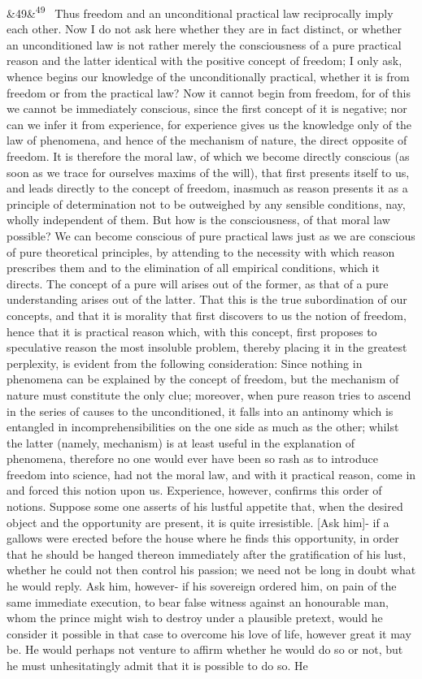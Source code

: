 \documentclass[12pt]{article}
\newcommand{\para}[1][]{\par\noindent\ifx&#1&\else\textsuperscript{\footnotesize #1}~\fi}
\begin{document}
\para[49] Thus freedom and an unconditional practical law reciprocally imply each other. Now I do not ask here whether they are in fact distinct, or whether an unconditioned law is not rather merely the consciousness of a pure practical reason and the latter identical with the positive concept of freedom; I only ask, whence begins our knowledge of the unconditionally practical, whether it is from freedom or from the practical law? Now it cannot begin from freedom, for of this we cannot be immediately conscious, since the first concept of it is negative; nor can we infer it from experience, for experience gives us the knowledge only of the law of phenomena, and hence of the mechanism of nature, the direct opposite of freedom. It is therefore the moral law, of which we become directly conscious (as soon as we trace for ourselves maxims of the will), that first presents itself to us, and leads directly to the concept of freedom, inasmuch as reason presents it as a principle of determination not to be outweighed by any sensible conditions, nay, wholly independent of them. But how is the consciousness, of that moral law possible? We can become conscious of pure practical laws just as we are conscious of pure theoretical principles, by attending to the necessity with which reason prescribes them and to the elimination of all empirical conditions, which it directs. The concept of a pure will arises out of the former, as that of a pure understanding arises out of the latter. That this is the true subordination of our concepts, and that it is morality that first discovers to us the notion of freedom, hence that it is practical reason which, with this concept, first proposes to speculative reason the most insoluble problem, thereby placing it in the greatest perplexity, is evident from the following consideration: Since nothing in phenomena can be explained by the concept of freedom, but the mechanism of nature must constitute the only clue; moreover, when pure reason tries to ascend in the series of causes to the unconditioned, it falls into an antinomy which is entangled in incomprehensibilities on the one side as much as the other; whilst the latter (namely, mechanism) is at least useful in the explanation of phenomena, therefore no one would ever have been so rash as to introduce freedom into science, had not the moral law, and with it practical reason, come in and forced this notion upon us. Experience, however, confirms this order of notions. Suppose some one asserts of his lustful appetite that, when the desired object and the opportunity are present, it is quite irresistible. [Ask him]- if a gallows were erected before the house where he finds this opportunity, in order that he should be hanged thereon immediately after the gratification of his lust, whether he could not then control his passion; we need not be long in doubt what he would reply. Ask him, however- if his sovereign ordered him, on pain of the same immediate execution, to bear false witness against an honourable man, whom the prince might wish to destroy under a plausible pretext, would he consider it possible in that case to overcome his love of life, however great it may be. He would perhaps not venture to affirm whether he would do so or not, but he must unhesitatingly admit that it is possible to do so. He 
\end{document}
